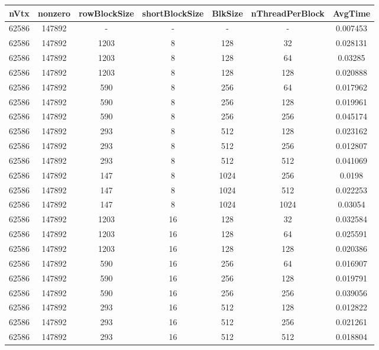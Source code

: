 \documentclass[9pt]{article}
\begin{document}
\SetBgPosition{0.25cm,-5.0cm}
\begin{tabular}{|c|c|c|c|c|c|c| }  
\hline
nVtx  & nonzero  & rowBlockSize  & shortBlockSize  & BlkSize  & nThreadPerBlock  & AvgTime \\
\hline
62586  & 147892  &  -  & -  & -  & -  &0.007453 \\
\hline
62586  & 147892  & 1203  & 8  & 128  & 32  & 0.028131 \\
\hline
62586  & 147892  & 1203  & 8  & 128  & 64  & 0.03285 \\
\hline
62586  & 147892  & 1203  & 8  & 128  & 128  & 0.020888 \\
\hline
62586  & 147892  & 590  & 8  & 256  & 64  & 0.017962 \\
\hline
62586  & 147892  & 590  & 8  & 256  & 128  & 0.019961 \\
\hline
62586  & 147892  & 590  & 8  & 256  & 256  & 0.045174 \\
\hline
62586  & 147892  & 293  & 8  & 512  & 128  & 0.023162 \\
\hline
62586  & 147892  & 293  & 8  & 512  & 256  & 0.012807 \\
\hline
62586  & 147892  & 293  & 8  & 512  & 512  & 0.041069 \\
\hline
62586  & 147892  & 147  & 8  & 1024  & 256  & 0.0198 \\
\hline
62586  & 147892  & 147  & 8  & 1024  & 512  & 0.022253 \\
\hline
62586  & 147892  & 147  & 8  & 1024  & 1024  & 0.03054 \\
\hline
62586  & 147892  & 1203  & 16  & 128  & 32  & 0.032584 \\
\hline
62586  & 147892  & 1203  & 16  & 128  & 64  & 0.025591 \\
\hline
62586  & 147892  & 1203  & 16  & 128  & 128  & 0.020386 \\
\hline
62586  & 147892  & 590  & 16  & 256  & 64  & 0.016907 \\
\hline
62586  & 147892  & 590  & 16  & 256  & 128  & 0.019791 \\
\hline
62586  & 147892  & 590  & 16  & 256  & 256  & 0.039056 \\
\hline
62586  & 147892  & 293  & 16  & 512  & 128  & 0.012822 \\
\hline
62586  & 147892  & 293  & 16  & 512  & 256  & 0.021261 \\
\hline
62586  & 147892  & 293  & 16  & 512  & 512  & 0.018804 \\

\end{tabular}
\end{document}
